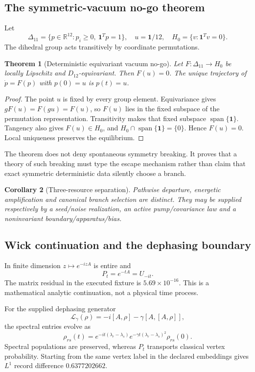 \documentclass[11pt,a4paper]{article}
\newtheorem{theorem}{Theorem}[section]\newtheorem{proposition}[theorem]{Proposition}\newtheorem{corollary}[theorem]{Corollary}
\theoremstyle{definition}\newtheorem{definition}[theorem]{Definition}
\theoremstyle{remark}\newtheorem{remark}[theorem]{Remark}
\newcommand{\R}{\mathbb R}\newcommand{\C}{\mathbb C}\newcommand{\Z}{\mathbb Z}\newcommand{\one}{\bm 1}
\begin{document}
\subsection{The symmetric-vacuum no-go theorem}

Let
\[
\Delta_{11}=\{p\in\R^{12}:p_i\ge0,\ \one^Tp=1\},
\quad u=\one/12,
\quad H_0=\{v:\one^Tv=0\}.
\]
The dihedral group acts transitively by coordinate permutations.

\begin{theorem}[Deterministic equivariant vacuum no-go]\label{thm:nogo}
Let $F:\Delta_{11}\to H_0$ be locally Lipschitz and $D_{12}$-equivariant. Then $F(u)=0$. The unique trajectory of $\dot p=F(p)$ with $p(0)=u$ is $p(t)=u$.
\end{theorem}
\begin{proof}
The point $u$ is fixed by every group element. Equivariance gives $gF(u)=F(gu)=F(u)$, so $F(u)$ lies in the fixed subspace of the permutation representation. Transitivity makes that fixed subspace $\operatorname{span}\{\one\}$. Tangency also gives $F(u)\in H_0$, and $H_0\cap\operatorname{span}\{\one\}=\{0\}$. Hence $F(u)=0$. Local uniqueness preserves the equilibrium.
\end{proof}

The theorem does not deny spontaneous symmetry breaking. It proves that a theory of such breaking must type the escape mechanism rather than claim that exact symmetric deterministic data silently choose a branch.

\begin{corollary}[Three-resource separation]
Pathwise departure, energetic amplification and canonical branch selection are distinct. They may be supplied respectively by a seed/noise realization, an active pump/covariance law and a noninvariant boundary/apparatus/bias.
\end{corollary}

\subsection{Wick continuation and the dephasing boundary}

In finite dimension $z\mapsto e^{-izA}$ is entire and
\[
\boxed{P_t=e^{-tA}=U_{-it}.}
\]
The matrix residual in the executed fixture is $5.69\times10^{-16}$. This is a mathematical analytic continuation, not a physical time process.

For the supplied dephasing generator
\[
\mathcal L_\gamma(\rho)=-i[A,\rho]-\gamma[A,[A,\rho]],
\]
the spectral entries evolve as
\[
\rho_{rs}(t)=e^{-it(\lambda_r-\lambda_s)}
e^{-\gamma t(\lambda_r-\lambda_s)^2}\rho_{rs}(0).
\]
Spectral populations are preserved, whereas $P_t$ transports classical vertex probability. Starting from the same vertex label in the declared embeddings gives $L^1$ record difference $0.6377202662$.
\end{document}
